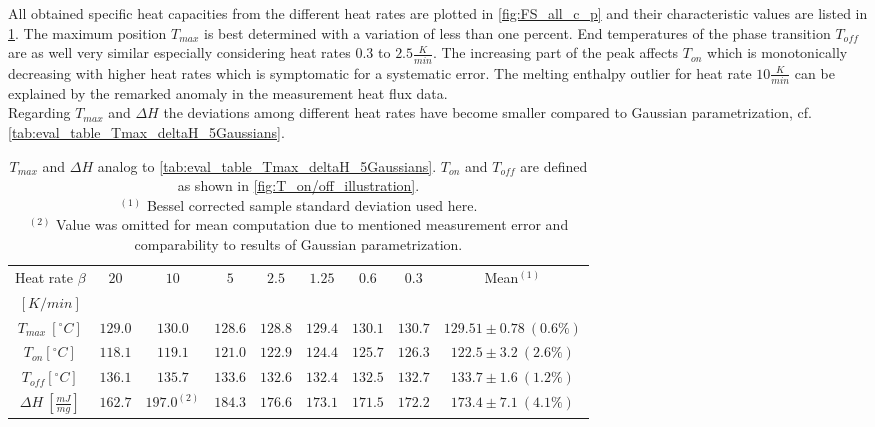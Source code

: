 \documentclass{scrartcl}[12pt, halfparskip]
\numberwithin{equation}{section}
\numberwithin{figure}{section}
\numberwithin{table}{section}
\begin{document}
All obtained specific heat capacities from the different heat rates are plotted in \cref{fig:FS_all_c_p} and their characteristic values are listed in \cref{tab:eval_table_Tmax_deltaH_FS}. The maximum position $T_{max}$ is best determined with a variation of less than one percent. End temperatures of the phase transition $T_{off}$ are as well very similar especially considering heat rates $0.3$ to $2.5 \frac{K}{min}$. The increasing part of the peak affects $T_{on}$ which is monotonically decreasing with higher heat rates which is symptomatic for a systematic error. The melting enthalpy outlier for heat rate $10 \frac{K}{min}$ can be explained by the remarked anomaly in the measurement heat flux data. \\
Regarding $T_{max}$ and $\Delta H$ the deviations among different heat rates have become smaller compared to Gaussian parametrization, cf. \cref{tab:eval_table_Tmax_deltaH_5Gaussians}.


\begin{table}[H]
	\centering
	\begin{tabular}{| c | c | c | c | c | c | c | c || c |} \hline
		Heat rate $\beta$ & $20$ & $10$ & $5$ & $2.5$ & $1.25$ & $0.6$ & $0.3$ & Mean$^{(1)}$ \\
		$[K/min]$ & & & & & & & & \\ \hline
		$T_{max} \ [^{\circ}C]$ & $129.0$ & $130.0$ & $128.6$ & $128.8$ & $129.4$ & $130.1$ & $130.7$ & $129.51 \pm 0.78 \ (0.6\%)$ \\[0.7ex]
		$T_{on} [^{\circ} C]$ & $118.1$ & $119.1$ & $121.0$ & $122.9$ & $124.4$ & $125.7$ & $126.3$ & $122.5 \pm 3.2 \ (2.6\%)$ \\[0.7ex]
		$T_{off} [^{\circ} C]$ & $136.1$ & $135.7$ & $133.6$ & $132.6$ & $132.4$ & $132.5$ & $132.7$ & $133.7 \pm 1.6 \ (1.2\%)$ \\[0.7ex]
		$\Delta H \ [\frac{mJ}{mg}]$ & $162.7$ & $197.0^{(2)}$ & $184.3$ & $176.6$ & $173.1$ & $171.5$ & $172.2$ & $173.4 \pm 7.1 \ (4.1\%)$ \\ \hline
	\end{tabular}
	\caption{$T_{max}$ and $\Delta H$ analog to \cref{tab:eval_table_Tmax_deltaH_5Gaussians}. $T_{on}$ and $T_{off}$ are defined as shown in \cref{fig:T_on/off_illustration}. \\
	$^{(1)}$ Bessel corrected sample standard deviation used here. \\
	$^{(2)}$ Value was omitted for mean computation due to mentioned measurement error and comparability to results of Gaussian parametrization.}
	\label{tab:eval_table_Tmax_deltaH_FS}
\end{table}
\end{document}
